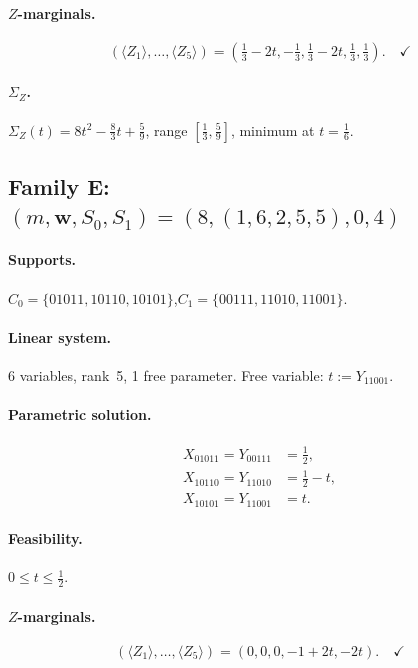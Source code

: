 \documentclass{article}
\newcommand{\SigZ}{\Sigma_Z}
\begin{document}
\paragraph{$Z$-marginals.}
\[
(\langle Z_1\rangle,\dots,\langle Z_5\rangle)
= (\tfrac13-2t, {-}\tfrac13, \tfrac13-2t, \tfrac13, \tfrac13). \quad\checkmark
\]

\paragraph{$\SigZ$.}
$\SigZ(t)=8t^2-\frac{8}{3}t+\frac{5}{9}$, range $[\tfrac13,\tfrac59]$, minimum at $t=\tfrac16$. \checkmark

\subsection{Family E: $(m,\mathbf{w},S_0,S_1)=(8,(1,6,2,5,5),0,4)$}

\paragraph{Supports.}
$C_0=\{01011, 10110, 10101\}$,\quad $C_1=\{00111, 11010, 11001\}$.

\paragraph{Linear system.}
6 variables, rank~5, 1 free parameter.
Free variable: $t:=Y_{11001}$.

\paragraph{Parametric solution.}
\[
\begin{aligned}
X_{01011} = Y_{00111} &= \tfrac{1}{2}, \\
X_{10110} = Y_{11010} &= \tfrac{1}{2}-t, \\
X_{10101} = Y_{11001} &= t.
\end{aligned}
\]

\paragraph{Feasibility.} $0\le t\le \frac{1}{2}$. \checkmark

\paragraph{$Z$-marginals.}
\[
(\langle Z_1\rangle,\dots,\langle Z_5\rangle)
= (0, 0, 0, {-}1+2t, {-}2t). \quad\checkmark
\]
\end{document}
